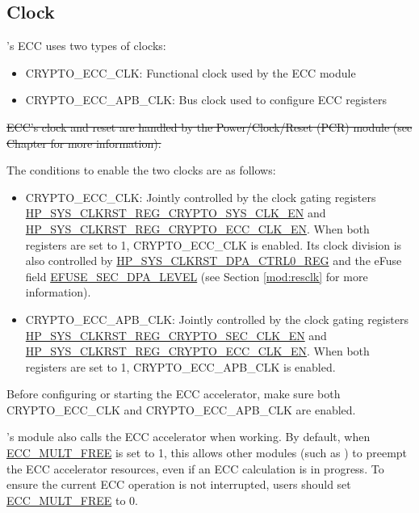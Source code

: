 \documentclass[main\_\_EN.tex]{subfiles}
\begin{document}
\subsection{Clock}
\label{sec:ecc-clk}

\chipname{}'s ECC uses two types of clocks:

\begin{itemize}
    \item CRYPTO\_ECC\_CLK: Functional clock used by the ECC module
    \item CRYPTO\_ECC\_APB\_CLK: Bus clock used to configure ECC registers
\end{itemize}

\sout{ECC's clock and reset are handled by the Power/Clock/Reset (PCR) module (see Chapter  for more information).}

The conditions to enable the two clocks are as follows:

\begin{itemize}
    \item CRYPTO\_ECC\_CLK: Jointly controlled by the clock gating registers \hyperref[fielddesc:HPSYSCLKRSTREGCRYPTOSYSCLKEN]{HP\_SYS\_CLKRST\_REG\_CRYPTO\_SYS\_CLK\_EN} and \hyperref[fielddesc:HPSYSCLKRSTREGCRYPTOECCCLKEN]{HP\_SYS\_CLKRST\_REG\_CRYPTO\_ECC\_CLK\_EN}. When both registers are set to 1, CRYPTO\_ECC\_CLK is enabled. Its clock division is also controlled by \hyperref[regdesc:HPSYSCLKRSTDPACTRL0REG]{HP\_SYS\_CLKRST\_DPA\_CTRL0\_REG} and the eFuse field \hyperref[fielddesc:EFUSESECDPALEVE]{EFUSE\_SEC\_DPA\_LEVEL} (see Section \ref{mod:resclk} \textit{} for more information).
    \item CRYPTO\_ECC\_APB\_CLK: Jointly controlled by the clock gating registers \hyperref[fielddesc:HPSYSCLKRSTREGCRYPTOSECCLKEN]{HP\_SYS\_CLKRST\_REG\_CRYPTO\_SEC\_CLK\_EN} and \hyperref[fielddesc:HPSYSCLKRSTREGCRYPTOECCCLKEN]{HP\_SYS\_CLKRST\_REG\_CRYPTO\_ECC\_CLK\_EN}. When both registers are set to 1, CRYPTO\_ECC\_APB\_CLK is enabled.
\end{itemize}

Before configuring or starting the ECC accelerator, make sure both CRYPTO\_ECC\_CLK and CRYPTO\_ECC\_APB\_CLK are enabled.




\begin{importantlisting}
\chipname{}'s  module also calls the ECC accelerator when working. By default, when \hyperref[fielddesc:ECCMULTFREE]{ECC\_MULT\_FREE} is set to 1, this allows other modules (such as ) to preempt the ECC accelerator resources, even if an ECC calculation is in progress. To ensure the current ECC operation is not interrupted, users should set \hyperref[fielddesc:ECCMULTFREE]{ECC\_MULT\_FREE} to 0.
\end{importantlisting}
\vspace{-0.5em}
\end{document}
